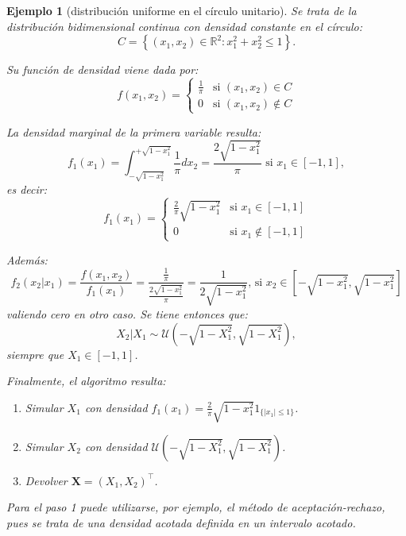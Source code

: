 \documentclass[
  spanish,
  10pt,
]{book}
\renewcommand{\mathbf}[1]{\symbf{#1}}
\theoremstyle{break}
\newtheorem{example}{Ejemplo}[chapter]
\theoremstyle{nonumberplain}
\begin{document}
\begin{example}[distribución uniforme en el círculo unitario]

Se trata de la distribución bidimensional continua con densidad
constante en el círculo:
\[C = \left\{ \left( x_1, x_2 \right)  \in \mathbb{R}^2 : x_1^2 + x_2^2 \leq 1 \right\}.\]

Su función de densidad viene dada por:
\[f\left( x_1,x_2\right) = \left\{
\begin{array}{ll}
\frac{1}{\pi} & \text{si } \left( x_1,x_2\right)  \in C\\
0 & \text{si } \left( x_1,x_2\right)  \notin C
\end{array}\right.\]

La densidad marginal de la primera variable resulta:
\[f_1\left( x_1\right) = \int_{-\sqrt{1-x_1^2}}^{+\sqrt{1-x_1^2}}\frac{1}{\pi}dx_2
= \frac{2\sqrt{1-x_1^2}}{\pi}
\text{ si }x_1\in\left[-1,1\right],\]
es decir:
\[f_1\left( x_1\right) = \left\{
\begin{array}{ll}
\frac{2}{\pi}\sqrt{1-x_1^2} & \text{si } x_1\in[-1, 1]  \\
0 & \text{si } x_1\notin\left[ -1,1\right]  
\end{array}\right.\]

Además:
\[f_2\left( x_2|x_1\right) = \frac{f\left( x_1,x_2\right)  }{f_1\left( x_1\right)} = \frac{\frac{1}{\pi}}{\frac{2\sqrt{1-x_1^2}}{\pi}}= \frac{1}{2\sqrt{1-x_1^2}}\text{, si }x_2\in\left[
-\sqrt{1-x_1^2},\sqrt{1-x_1^2}\right]\]
valiendo cero en otro caso.
Se tiene entonces que:
\[X_2|X_1 \sim \mathcal{U}\left(  -\sqrt{1-X_1^2},\sqrt{1-X_1^2}\right),\]
siempre que \(X_1\in[-1, 1]\).

Finalmente, el algoritmo resulta:

\begin{enumerate}
\def\labelenumi{\arabic{enumi}.}
\item
  Simular \(X_1\) con densidad \(f_1\left(
  x_1\right) = \frac{2}{\pi}\sqrt{1-x_1^2}1_{\{|x_1|\leq1\}}\).
\item
  Simular \(X_2\) con densidad \(\mathcal{U}\left(
  -\sqrt{1-X_1^2},\sqrt{1-X_1^2}\right)\).
\item
  Devolver \(\mathbf{X}= \left( X_1,X_2\right)^{\top}\).
\end{enumerate}

Para el paso 1 puede utilizarse, por ejemplo, el método de
aceptación-rechazo, pues se trata de una densidad acotada definida en un
intervalo acotado.
\end{example}
\end{document}
